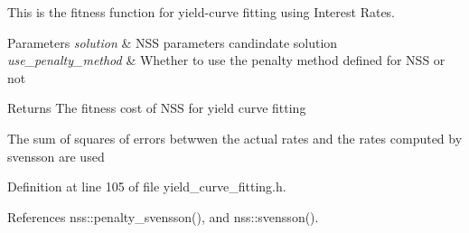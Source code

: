 This is the fitness function for yield-\/curve fitting using Interest Rates. 


\begin{DoxyParams}{Parameters}
{\em solution} & N\+SS parameters candindate solution \\
\hline
{\em use\+\_\+penalty\+\_\+method} & Whether to use the penalty method defined for N\+SS or not \\
\hline
\end{DoxyParams}
\begin{DoxyReturn}{Returns}
The fitness cost of N\+SS for yield curve fitting 
\end{DoxyReturn}
The sum of squares of errors betwwen the actual rates and the rates computed by svensson are used 

Definition at line 105 of file yield\+\_\+curve\+\_\+fitting.\+h.



References nss\+::penalty\+\_\+svensson(), and nss\+::svensson().


